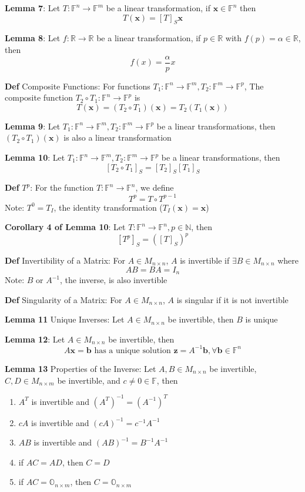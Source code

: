 \documentclass[11pt,notitlepage]{report}
\newcommand{\bb}[1]{\ensuremath{\mathbb{#1}}}
\newcommand{\tbf}[1]{\textbf{#1}}
\begin{document}
\textbf{Lemma 7}: Let $T : \bb F^n \rightarrow \bb F^m$ be a linear transformation, if $\tbf x \in \bb F^n$ then
$$T(\tbf x) = [T]_S \tbf x$$

\textbf{Lemma 8}: Let $f : \bb R \rightarrow \bb R$ be a linear transformation, if $p \in \bb R$ with $f(p) = \alpha \in \bb R$, then
$$f(x) = \frac{\alpha}{p}x$$

\newpage

\textbf{Def} Composite Functions: For functions $T_1: \bb F^n \rightarrow \bb F^m, T_2: \bb F^m \rightarrow \bb F^p$, The composite function $T_2 \circ T_1 : \bb F^n \rightarrow \bb F^p$ is
$$T(\tbf x) = (T_2 \circ T_1)(\tbf x) = T_2(T_1(\tbf x))$$

\textbf{Lemma 9}: Let $T_1: \bb F^n \rightarrow \bb F^m, T_2: \bb F^m \rightarrow \bb F^p$ be a linear transformations, then $(T_2 \circ T_1)(\tbf x)$ is also a linear transformation

\textbf{Lemma 10}: Let $T_1: \bb F^n \rightarrow \bb F^m, T_2: \bb F^m \rightarrow \bb F^p$ be a linear transformations, then 
$$[T_2 \circ T_1]_S=[T_2]_S[T_1]_S$$

\textbf{Def} $T^p$: For the function $T: \bb F^n \rightarrow \bb F^n$, we define
$$T^p = T \circ T^{p-1}$$
\hspace*{5mm} Note: $T^0 = T_I$, the identity transformation ($T_I(\tbf x) = \tbf x$)

\textbf{Corollary 4 of Lemma 10}: Let $T: \bb F^n \rightarrow \bb F^n, p \in \bb N$, then 
$$[T^p]_S = ([T]_S)^p$$

\textbf{Def} Invertibility of a Matrix: For $A \in M_{n \times n}$, $A$ is invertible if $\exists B \in M_{n \times n}$ where
$$AB = BA = I_n$$
\hspace*{5mm} Note: $B$ or $A^{-1}$, the inverse, is also invertible

\textbf{Def} Singularity of a Matrix: For $A \in M_{n \times n}$, $A$ is singular if it is not invertible

\textbf{Lemma 11} Unique Inverses: Let $A \in M_{n \times n}$ be invertible, then $B$ is unique

\textbf{Lemma 12}: Let $A \in M_{n \times n}$ be invertible, then
$$A\tbf x = \tbf b \text{ has a unique solution } \tbf z = A^{-1}\tbf b, \forall \tbf b \in \bb F^n$$

\textbf{Lemma 13} Properties of the Inverse: Let $A, B \in M_{n \times n}$ be invertible, $C, D \in M_{n \times m}$ be invertible, and $c \ne 0 \in \bb F$, then
\begin{enumerate}[label=(\roman*)]
    \item $A^T$ is invertible and $(A^T)^{-1} = (A^{-1})^T$
    \item $cA$ is invertible and $(cA)^{-1} = c^{-1}A^{-1}$
    \item $AB$ is invertible and $(AB)^{-1} = B^{-1}A^{-1}$
    \item if $AC = AD$, then $C = D$
    \item if $AC = \bb O_{n \times m}$, then $C = \bb O_{n \times m}$
\end{enumerate}
\end{document}
